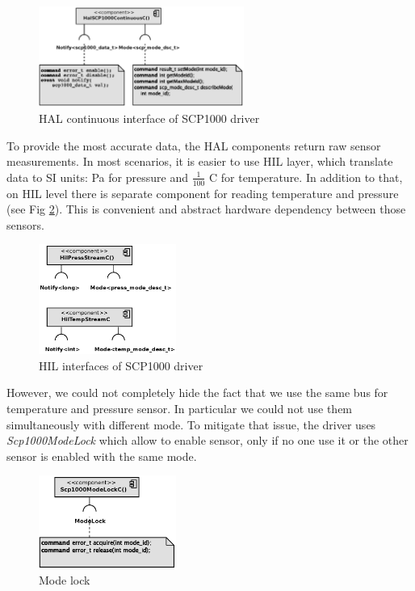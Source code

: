 \begin{figure}[h]
  \centering
  \includegraphics[width=0.6\textwidth]{diagrams/scp1000_continous.eps}
  \caption{HAL continuous interface of SCP1000 driver}
  \label{fig:scp1000_continous}
\end{figure}

To provide the most accurate data, the HAL components return raw sensor measurements.
In most scenarios, it is easier to use HIL layer, which translate data to SI units: Pa for pressure and $\frac{1}{100}$ C for temperature.
In addition to that, on HIL level there is separate component for reading temperature and pressure (see Fig \ref{fig:scp1000_hil}).
This is convenient and abstract hardware dependency between those sensors.

\begin{figure}[h]
  \centering
  \includegraphics[width=0.4\textwidth]{diagrams/scp1000_hil.eps}
  \caption{HIL interfaces of SCP1000 driver}
  \label{fig:scp1000_hil}
\end{figure}

However, we could not completely hide the fact that we use the same bus for temperature and pressure sensor.
In particular we could not use them simultaneously with different mode.
To mitigate that issue, the driver uses \emph{Scp1000ModeLock} which allow to enable sensor, only if no one use it or the other sensor is enabled with the same mode.

\begin{figure}[h]
  \centering
  \includegraphics[width=0.4\textwidth]{diagrams/scp1000_lock.eps}
  \caption{Mode lock}
  \label{fig:scp1000_lock}
\end{figure}








